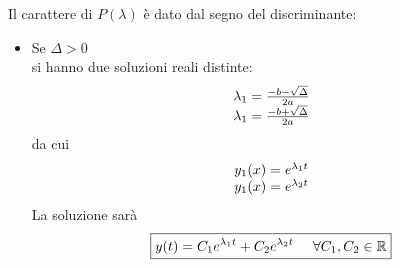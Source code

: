 Il carattere di $P(\lambda) $ è dato dal segno del discriminante:
\begin{itemize}
    \item Se $\Delta > 0$ \\
    si hanno due soluzioni reali distinte:
    \[  \begin{array}{l l}
        \lambda_1 = \frac{-b - \sqrt{\Delta}}{2a} \\
        \lambda_1 = \frac{-b + \sqrt{\Delta}}{2a} 
    \end{array} \]
    da cui 
    \begin{equation}
        \begin{array}{l l}
            y_1(x) = e^{\lambda_1 t} \\
            y_1(x) = e^{\lambda_2 t} 
        \end{array} 
    \end{equation}  
    La soluzione sarà
    \begin{equation}
        \boxed{y(t) = C_1 e^{\lambda_1 t} + C_2 e^{\lambda_2 t} \mspace{25mu} \forall C_1, C_2 \in \mathbb{R}}
    \end{equation}


\end{itemize}
